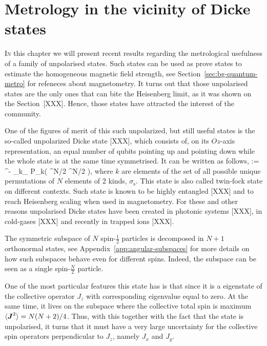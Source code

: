 \section[Quantum metrology with Dike like states]
{Metrology in the vicinity of Dicke states}


\lettrine[lines=2, findent=3pt,nindent=0pt]{I}{n} this chapter we will present recent results regarding the metrological usefulness of a family of unpolarised states.
Such states can be used as prove states to estimate the homogeneous magnetic field strength, see Section~\ref{sec:bg-quantum-metro} for refeneces about magnetometry.
It turns out that those unpolarised states are the only ones that can bite the Heisenberg limit, as it was shown on the Section~{[XXX]}.
Hence, those states have attracted the interest of the community.

One of the figures of merit of this such unpolarized, but still useful states is the so-called unpolarized Dicke state [XXX], which consists of, on its $Oz$-axis  representation, an equal number of qubits pointing up and pointing down while the whole state is at the same time symmetrised.
It can be written as follows,
\be
   \equiv {}:= ^{-}
  \sum_{k\in \sigma_}
  P_{k}\left( ^{\otimes N/2} ^{\otimes N/2}
  \right),
  \label{eq:vd-unpolarised-dicke}
\ee
where $k$ are elements of the set of all possible unique permutations of $N$ elements of 2 kinds, $\sigma_\text{s}$.
This state is also called twin-fock state on different contexts.
Such state is known to be highly entangled [XXX] and to reach Heisenberg scaling when used in magnetometry.
For these and other reasons unpolarised Dicke states have been created in photonic systems [XXX], in cold-gases [XXX] and recently in trapped ions [XXX].

The symmetric subspace of $N$ spin-$\frac{1}{2}$ particles is decomposed in $N+1$ orthonormal states, see Appendix~\ref{app:angular-subspaces} for more details on how such subspaces behave even for different spins.
Indeed, the subspace can be seen as a single spin-$\frac{N}{2}$ particle.

One of the most particular features this state has is that since it is a eigenstate of the collective operator $J_z$ with corresponding eigenvalue equal to zero.
At the same time, it lives on the subspace where the collective total spin is maximum\ie $\langle \boldsymbol{J}^2 \rangle=N(N+2)/4$.
Thus, with this together with the fact that the state is unpolarised, it turns that it must have a very large uncertainty for the collective spin operators perpendicular to $J_z$, namely $J_x$ and $J_y$.

